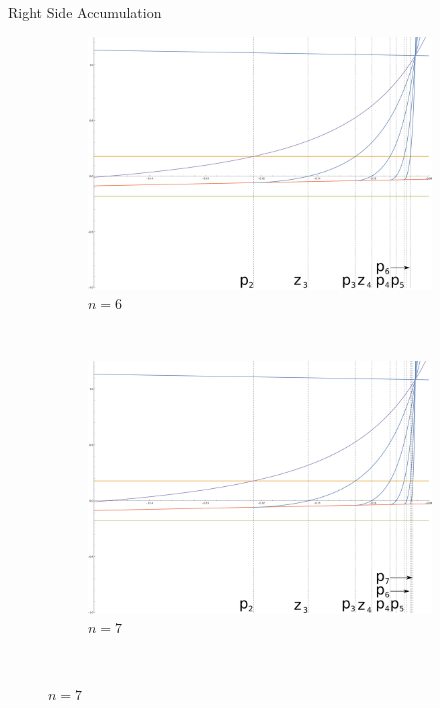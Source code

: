 \documentclass{beamer}
\newcommand{\<}{\left\langle}
\renewcommand{\>}{\right\rangle} %
\renewcommand{\*}{\cdot} %
\begin{document}
\begin{frame}[allowframebreaks]{Right Side Accumulation}
\begin{figure}[ht]
\begin{subfigure}[b]{0.5\textwidth}
				\includegraphics[width=\textwidth]{./img/cplot5H}
				\caption{$n=6$}
				\label{fig:cplot5H}
		\end{subfigure}%
		~ %
		\begin{subfigure}[b]{0.5\textwidth}
				\includegraphics[width=\textwidth]{./img/cplot6H}
				\caption{$n=7$}
				\label{fig:cplot6H}
		\end{subfigure}
		~ %
\end{figure}
\end{frame}
\end{document}
